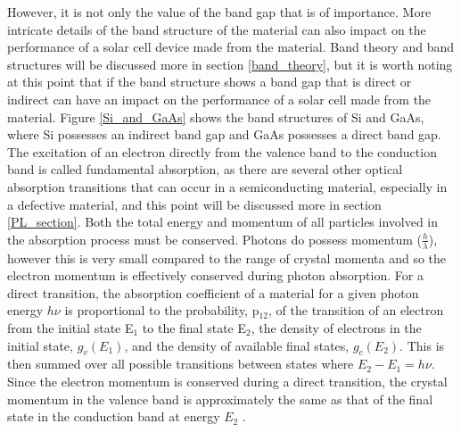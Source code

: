 However, it is not only the value of the band gap that is of importance. More intricate details of the band structure of the material can also impact on the performance of a solar cell device made from the material. Band theory and band structures will be discussed more in section \ref{band_theory}, but it is worth noting at this point that if the band structure shows a band gap that is direct or indirect can have an impact on the performance of a solar cell made from the material. Figure \ref{Si_and_GaAs} shows the band structures of Si and GaAs, where Si possesses an indirect band gap and GaAs possesses a direct band gap. The excitation of an electron directly from the valence band to the conduction band is called fundamental absorption, as there are several other optical absorption transitions that can occur in a semiconducting material, especially in a defective material, and this point will be discussed more in section \ref{PL_section}. Both the total energy and momentum of all particles involved in the absorption process must be conserved. Photons do possess momentum ($\frac{h}{\lambda}$), however this is very small compared to the range of crystal momenta and so the electron momentum is effectively conserved during photon absorption. For a direct transition, the absorption coefficient of a material for a given photon energy $h \nu$ is proportional to the probability, p$_{12}$, of the transition of an electron from the initial state E$_1$ to the final state E$_2$, the density of electrons in the initial state, $g_{v}(E_1)$, and the density of available final states, $g_{c}(E_2)$. This is then summed over all possible transitions between states where $E_2 - E_1 = h\nu$. Since the electron momentum is conserved during a direct transition, the crystal momentum in the valence band is approximately the same as that of the final state in the conduction band at energy $E_2$ \cite{PV_bands_book}.

